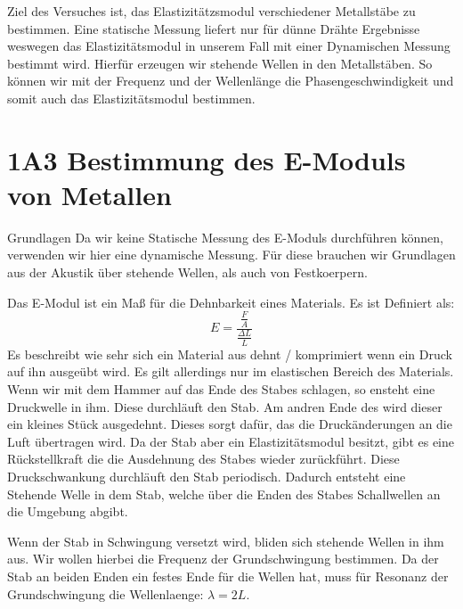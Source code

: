 \documentclass[twoside]{protokoll}
\begin{document}
\begin{versuchsziele}
Ziel des Versuches ist, das Elastizitätzsmodul verschiedener Metallstäbe zu bestimmen.
Eine statische Messung liefert nur für dünne Drähte Ergebnisse weswegen das Elastizitätsmodul in unserem Fall mit einer Dynamischen Messung bestimmt wird. Hierfür erzeugen wir stehende Wellen in den Metallstäben. So können wir mit der Frequenz und der Wellenlänge die Phasengeschwindigkeit und somit auch das Elastizitätsmodul bestimmen. 
\end{versuchsziele}

 
\section{1A3 Bestimmung des E-Moduls von Metallen}

\begin{aufgabe}{Grundlagen}
    Da wir keine Statische Messung des E-Moduls durchführen können, verwenden wir hier eine dynamische Messung.
    Für diese brauchen wir Grundlagen aus der Akustik über stehende Wellen, als auch von Festkoerpern.


    Das E-Modul ist ein Maß für die Dehnbarkeit eines Materials. Es ist Definiert als: 
    \begin{equation}
        E = \frac{\frac{F}{A}}{\frac{\Delta L}{L}}
    \end{equation}
    Es beschreibt wie sehr sich ein Material aus dehnt / komprimiert wenn ein Druck auf ihn ausgeübt wird.
    Es gilt allerdings nur im elastischen Bereich des Materials.\\
    
    Wenn wir mit dem Hammer auf das Ende des Stabes schlagen, so ensteht eine Druckwelle in ihm.
    Diese durchläuft den Stab. Am andren Ende des wird dieser ein kleines Stück ausgedehnt.
    Dieses sorgt dafür, das die Druckänderungen an die Luft übertragen wird.
    Da der Stab aber ein Elastizitätsmodul besitzt, gibt es eine Rückstellkraft die die Ausdehnung des Stabes wieder zurückführt.
    Diese Druckschwankung durchläuft den Stab periodisch.
    Dadurch entsteht eine Stehende Welle in dem Stab, welche über die Enden des Stabes Schallwellen an die Umgebung abgibt.

    Wenn der Stab in Schwingung versetzt wird, bliden sich stehende Wellen in ihm aus.
    Wir wollen hierbei die Frequenz der Grundschwingung bestimmen.
    Da der Stab an beiden Enden ein festes Ende für die Wellen hat, muss für Resonanz der Grundschwingung die Wellenlaenge: $\lambda = 2 L$. 
     

\end{aufgabe}
\end{document}
